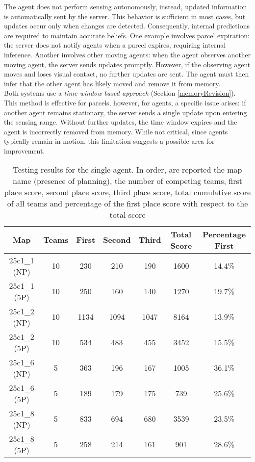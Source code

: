         The agent does not perform sensing autonomously, instead, updated information is automatically sent by the server. This behavior is sufficient in most cases, but updates occur only when changes are detected. Consequently, internal predictions are required to maintain accurate beliefs. One example involves parcel expiration: the server does not notify agents when a parcel expires, requiring internal inference. Another involves other moving agents: when the agent observes another moving agent, the server sends updates promptly. However, if the observing agent moves and loses visual contact, no further updates are sent. The agent must then infer that the other agent has likely moved and remove it from memory.
        \medskip\\
        Both systems use a \textit{time-window based approach} (Section \ref{memoryRevision}). This method is effective for parcels, however, for agents, a specific issue arises: if another agent remains stationary, the server sends a single update upon entering the sensing range. Without further updates, the time window expires and the agent is incorrectly removed from memory. While not critical, since agents typically remain in motion, this limitation suggests a possible area for improvement.


\newpage

\begin{table}[H]
    \centering
    \begin{tabular}{|c|c|c|c|c|c|c|}
        \hline
        Map & Teams & First & Second & Third & Total Score & Percentage First \\
        \hline
        25c1\_1 (NP)  & 10   & 230   & 210   & 190  & 1600  & 14.4\% \\
        25c1\_1 (5P)  & 10   & 250   & 160   & 140  & 1270  & 19.7\% \\
        25c1\_2 (NP)  & 10  & 1134  & 1094  & 1047  & 8164  & 13.9\% \\
        25c1\_2 (5P)  & 10   & 534   & 483   & 455  & 3452  & 15.5\% \\
        25c1\_6 (NP)   & 5   & 363   & 196   & 167  & 1005  & 36.1\% \\
        25c1\_6 (5P)   & 5   & 189   & 179   & 175   & 739  & 25.6\% \\
        25c1\_8 (NP)   & 5   & 833   & 694   & 680  & 3539  & 23.5\% \\
        25c1\_8 (5P)   & 5   & 258   & 214   & 161   & 901  & 28.6\% \\
        \hline
    \end{tabular}
    \caption{Testing results for the single-agent. In order, are reported the map name (presence of planning), the number of competing teams, first place score, second place score, third place score, total cumulative score of all teams and percentage of the first place score with respect to the total score}
    \label{tab:table_1}
\end{table}

